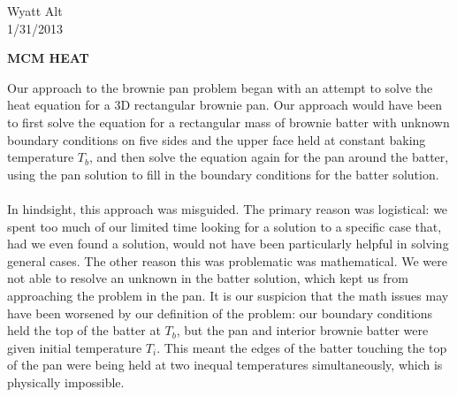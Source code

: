 \documentclass[11pt, fullpage]{article}
\begin{document}
\begin{flushright}
Wyatt Alt\\
1/31/2013\\
\end{flushright}
\begin{flushleft}
\textbf{MCM HEAT}\\
\end{flushleft}
Our approach to the brownie pan problem began with an attempt to solve the heat equation for a 3D rectangular brownie pan.  Our approach would have been to first solve the equation for a rectangular mass of brownie batter with unknown boundary conditions on five sides and the upper face held at constant baking temperature $T_b$, and then solve the equation again for the pan around the batter, using the pan solution to fill in the boundary conditions for the batter solution.\\
\\
In hindsight, this approach was misguided.  The primary reason was logistical: we spent too much of our limited time looking for a solution to a specific case that, had we even found a solution, would not have been particularly helpful in solving general cases.  The other reason this was problematic was mathematical.  We were not able to resolve an unknown in the batter solution, which kept us from approaching the problem in the pan.  It is our suspicion that the math issues may have been worsened by our definition of the problem: our boundary conditions held the top of the batter at $T_b$, but the pan and interior brownie batter were given initial temperature $T_i$.  This meant the edges of the batter touching the top of the pan were being held at two inequal temperatures simultaneously, which is physically impossible. 
\end{document}
